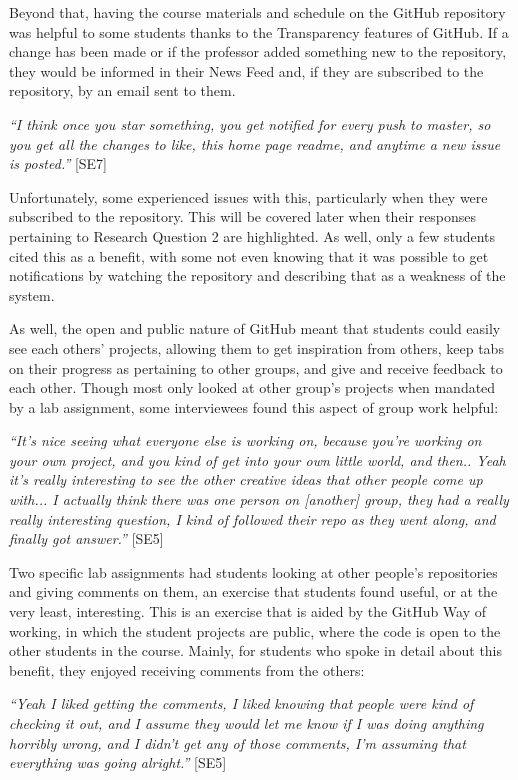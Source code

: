 Beyond that, having the course materials and schedule on the GitHub repository was helpful to some students thanks to the Transparency features of GitHub. If a change has been made or if the professor added something new to the repository, they would be informed in their News Feed and, if they are subscribed to the repository, by an email sent to them.

\textit{``I think once you star something, you get notified for every push to master, so you get all the changes to like, this home page readme, and anytime a new issue is posted.''} [SE7]

Unfortunately, some experienced issues with this, particularly when they were subscribed to the repository. This will be covered later when their responses pertaining to Research Question 2 are highlighted. As well, only a few students cited this as a benefit, with some not even knowing that it was possible to get notifications by watching the repository and describing that as a weakness of the system.

As well, the open and public nature of GitHub meant that students could easily see each others' projects, allowing them to get inspiration from others, keep tabs on their progress as pertaining to other groups, and give and receive feedback to each other. Though most only looked at other group's projects when mandated by a lab assignment, some interviewees found this aspect of group work helpful:

\textit{``It's nice seeing what everyone else is working on, because you're working on your own project, and you kind of get into your own little world, and then.. Yeah it's really interesting to see the other creative ideas that other people come up with... I actually think there was one person on [another] group, they had a really really interesting question, I kind of followed their repo as they went along, and finally got answer.''} [SE5]

Two specific lab assignments had students looking at other people's repositories and giving comments on them, an exercise that students found useful, or at the very least, interesting. This is an exercise that is aided by the GitHub Way of working, in which the student projects are public, where the code is open to the other students in the course. Mainly, for students who spoke in detail about this benefit, they enjoyed receiving comments from the others:

\textit{``Yeah I liked getting the comments, I liked knowing that people were kind of checking it out, and I assume they would let me know if I was doing anything horribly wrong, and I didn't get any of those comments, I'm assuming that everything was going alright.''} [SE5]

